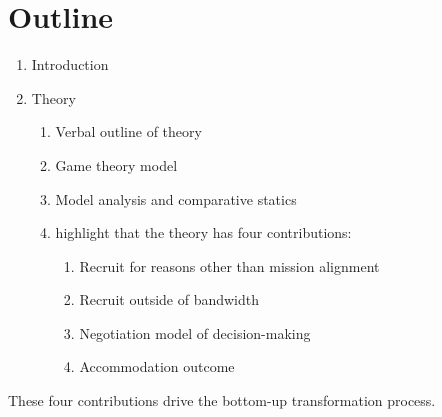 \chapter{Outline}

\begin{enumerate}
\item Introduction
\item Theory
\begin{enumerate} 
\item Verbal outline of theory
\item Game theory model
\item Model analysis and comparative statics
\item highlight that the theory has four contributions:
\begin{enumerate}
\item Recruit for reasons other than mission alignment
\item Recruit outside of bandwidth 
\item Negotiation model of decision-making
\item Accommodation outcome
\end{enumerate}
\end{enumerate}
\end{enumerate}
These four contributions drive the bottom-up transformation process.

